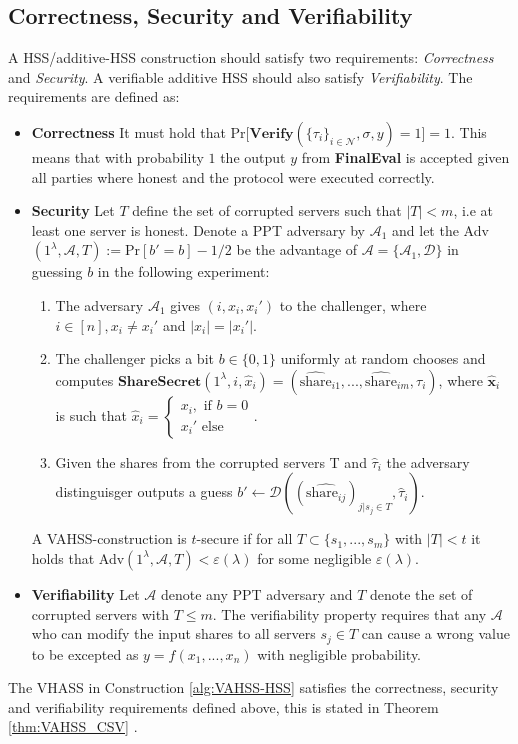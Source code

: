 \subsection*{Correctness, Security and Verifiability}
A HSS/additive-HSS construction should satisfy  two requirements: \textit{Correctness} and \textit{Security}. A verifiable additive HSS should also satisfy \textit{Verifiability}. The requirements are defined as:
\begin{itemize}
    \item \textbf{Correctness} It must hold that Pr$\Big[\textbf{Verify}(\{\tau_i\}_{i\in\mathcal{N}},\sigma,y)=1\Big]=1$. This means that with probability $1$ the output $y$ from \textbf{FinalEval} is accepted given all parties where honest and the protocol were executed correctly.
    \item \textbf{Security} Let $T$ define the set of corrupted servers such that $|T|<m$, i.e at least one server is honest.  Denote a PPT adversary by $\mathcal{A}_1$ and let the Adv$(1^\lambda,\mathcal{A},T):= \text{Pr}[b' = b]-1/2$ be the advantage of $\mathcal{A}=\{\mathcal{A}_1,\mathcal{D}\}$ in guessing $b$ in the following experiment:
    \begin{enumerate}
        \item The adversary $\mathcal{A}_1$ gives $(i,x_i,x_i')$ to the challenger, where $i\in[n], x_i\neq x_i'$ and $|x_i|=|x_i'|$.
        \item The challenger picks a bit $b\in\{0,1\}$ uniformly at random chooses and computes $\textbf{ShareSecret}(1^\lambda,i,\hat{x}_i) = (\hat{\text{share}}_{i1},...,\hat{\text{share}}_{im},\tau_i)$, where $\hat{\textbf{x}}_i$ is  such that $\hat{x}_i = \begin{cases}x_i, \text{ if } b=0 \\ x_i' \text{ else} \end{cases}$. 
        \item Given the shares from the corrupted servers T and $\hat{\tau}_i$ the adversary distinguisger outputs a guess $b'\xleftarrow[]{}\mathcal{D}((\hat{\text{share}_{ij}})_{j|s_j\in T},\hat{\tau}_i)$.
    \end{enumerate}
    A VAHSS-construction is $t$-secure if for all $T\subset \{s_1,...,s_m\}$ with $|T|<t$ it holds that Adv$(1^\lambda,\mathcal{A},T)<\varepsilon(\lambda)$ for some negligible $\varepsilon(\lambda)$.
 \item \textbf{Verifiability} Let $\mathcal{A}$ denote any PPT  adversary and $T$ denote the set of corrupted servers with $T\leq m$. The verifiability property requires that any $\mathcal{A}$ who can modify the input shares to all servers $s_j\in T$ can cause a wrong value to be excepted as $y=f(x_1,...,x_n)$ with negligible probability.   
\end{itemize}
The VHASS in Construction \ref{alg:VAHSS-HSS} satisfies the correctness, security and verifiability requirements defined above, this is stated in Theorem \ref{thm:VAHSS_CSV} .

